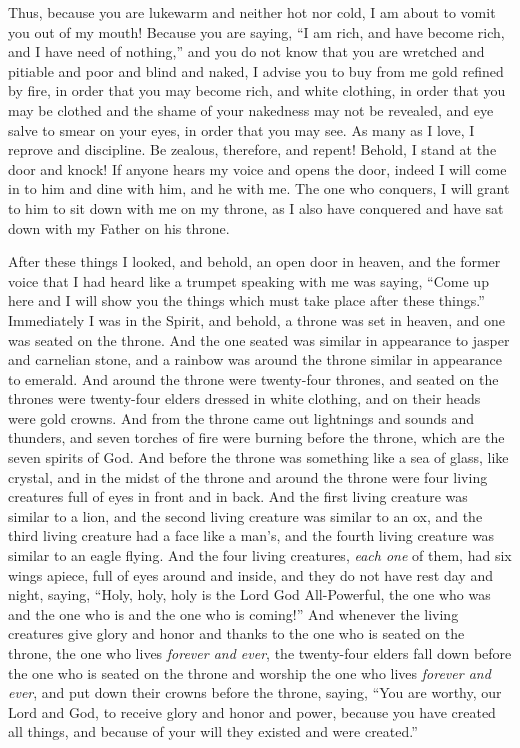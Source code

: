 \begin{biblechapter}
\verse Thus, because you are lukewarm and neither hot nor cold, I am about to vomit you out of my mouth!
\verse Because you are saying, “I am rich, and have become rich, and I have need of nothing,” and you do not know that you are wretched and pitiable and poor and blind and naked,
\verse I advise you to buy from me gold refined by fire, in order that you may become rich, and white clothing, in order that you may be clothed and the shame of your nakedness may not be revealed, and eye salve to smear on your eyes, in order that you may see.
\verse As many as I love, I reprove and discipline. Be zealous, therefore, and repent!
\verse Behold, I stand at the door and knock! If anyone hears my voice and opens the door, indeed I will come in to him and dine with him, and he with me.
\verse The one who conquers, I will grant to him to sit down with me on my throne, as I also have conquered and have sat down with my Father on his throne.
\end{biblechapter}

\begin{biblechapter} %
 After these things I looked, and behold, an open door in heaven, and the former voice that I had heard like a trumpet speaking with me was saying, “Come up here and I will show you the things which must take place after these things.”
\verse Immediately I was in the Spirit, and behold, a throne was set in heaven, and one was seated on the throne.
\verse And the one seated was similar in appearance to jasper and carnelian stone, and a rainbow was around the throne similar in appearance to emerald.
\verse And around the throne were twenty-four thrones, and seated on the thrones were twenty-four elders dressed in white clothing, and on their heads were gold crowns.
\verse And from the throne came out lightnings and sounds and thunders, and seven torches of fire were burning before the throne, which are the seven spirits of God.
\verse And before the throne was something like a sea of glass, like crystal, and in the midst of the throne and around the throne were four living creatures full of eyes in front and in back.
\verse And the first living creature was similar to a lion, and the second living creature was similar to an ox, and the third living creature had a face like a man’s, and the fourth living creature was similar to an eagle flying.
\verse And the four living creatures, \textit{each one} of them, had six wings apiece, full of eyes around and inside, and they do not have rest day and night, saying, “Holy, holy, holy is the Lord God All-Powerful, 
the one who was and the one who is and the one who is coming!”
\verse And whenever the living creatures give glory and honor and thanks to the one who is seated on the throne, the one who lives \textit{forever and ever},
\verse the twenty-four elders fall down before the one who is seated on the throne and worship the one who lives \textit{forever and ever}, and put down their crowns before the throne, saying,
\verse “You are worthy, our Lord and God, 
to receive glory and honor and power, 
because you have created all things, 
and because of your will they existed and were created.”
\end{biblechapter}

